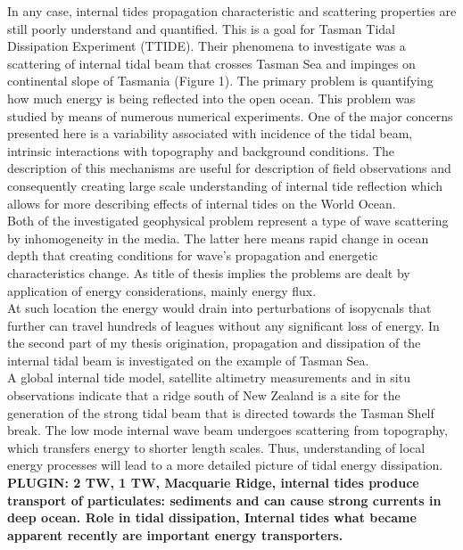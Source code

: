 In any case, internal tides propagation characteristic and scattering properties are still poorly understand and quantified. This is a goal for Tasman Tidal Dissipation Experiment (TTIDE). Their phenomena to investigate was a scattering of internal tidal beam that crosses Tasman Sea and impinges on continental slope of Tasmania (Figure 1). The primary problem is quantifying how much energy is being reflected into the open ocean. This problem was studied by means of numerous numerical experiments. One of the major concerns presented here is a variability associated with incidence of the tidal beam, intrinsic interactions with topography and background conditions. The description of this mechanisms are useful for description of field observations and consequently creating large scale understanding of internal tide reflection which allows for more describing effects of internal tides on the World Ocean.\\
Both of the investigated geophysical problem represent a type of wave scattering by inhomogeneity in the media. The latter here means rapid change in ocean depth that creating conditions for wave's propagation and energetic characteristics change. As title of thesis implies the problems are dealt by application of energy considerations, mainly energy flux.\\
At such location the energy would drain into perturbations of isopycnals that further can travel hundreds of  leagues without any significant loss of energy. In the second part of my thesis origination, propagation and dissipation of the internal tidal beam is investigated on the example of Tasman Sea. \\
A global internal tide model, satellite altimetry measurements and in situ observations indicate that a ridge south of New Zealand is a site for the generation of the strong tidal beam that is directed towards the Tasman Shelf break. The low mode internal wave beam undergoes scattering from topography, which transfers energy to shorter length scales. Thus, understanding of local energy processes will lead to a more detailed picture of tidal energy dissipation.\\
\textbf{PLUGIN: 2 TW, 1 TW, Macquarie Ridge, internal tides produce transport of particulates: sediments and can cause strong currents in deep ocean. Role in tidal dissipation, Internal tides what became apparent recently are important energy transporters.}
